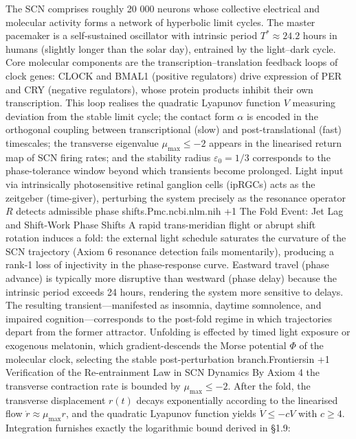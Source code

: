 The SCN comprises roughly 20 000 neurons whose collective electrical and molecular activity forms a network of hyperbolic limit cycles. The master pacemaker is a self-sustained oscillator with intrinsic period $  T^* \approx 24.2  $ hours in humans (slightly longer than the solar day), entrained by the light–dark cycle. Core molecular components are the transcription–translation feedback loops of clock genes: CLOCK and BMAL1 (positive regulators) drive expression of PER and CRY (negative regulators), whose protein products inhibit their own transcription. This loop realises the quadratic Lyapunov function $  V  $ measuring deviation from the stable limit cycle; the contact form $  \alpha  $ is encoded in the orthogonal coupling between transcriptional (slow) and post-translational (fast) timescales; the transverse eigenvalue $  \mu_{\max} \le -2  $ appears in the linearised return map of SCN firing rates; and the stability radius $  \varepsilon_0 = 1/3  $ corresponds to the phase-tolerance window beyond which transients become prolonged. Light input via intrinsically photosensitive retinal ganglion cells (ipRGCs) acts as the zeitgeber (time-giver), perturbing the system precisely as the resonance operator $  R  $ detects admissible phase shifts.⁠Pmc.ncbi.nlm.nih +1
The Fold Event: Jet Lag and Shift-Work Phase Shifts
A rapid trans-meridian flight or abrupt shift rotation induces a fold: the external light schedule saturates the curvature of the SCN trajectory (Axiom 6 resonance detection fails momentarily), producing a rank-1 loss of injectivity in the phase-response curve. Eastward travel (phase advance) is typically more disruptive than westward (phase delay) because the intrinsic period exceeds 24 hours, rendering the system more sensitive to delays. The resulting transient—manifested as insomnia, daytime somnolence, and impaired cognition—corresponds to the post-fold regime in which trajectories depart from the former attractor. Unfolding is effected by timed light exposure or exogenous melatonin, which gradient-descends the Morse potential $  \Phi  $ of the molecular clock, selecting the stable post-perturbation branch.⁠Frontiersin +1
Verification of the Re-entrainment Law in SCN Dynamics
By Axiom 4 the transverse contraction rate is bounded by $  \mu_{\max} \le -2  $. After the fold, the transverse displacement $  r(t)  $ decays exponentially according to the linearised flow $  \dot{r} \approx \mu_{\max} r  $, and the quadratic Lyapunov function yields $  \dot{V} \le -c V  $ with $  c \ge 4  $. Integration furnishes exactly the logarithmic bound derived in §1.9:
